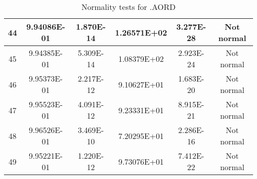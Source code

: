 \begin{table}[h]
\begin{tabular}{|c|c|c|c|c|c|}
		44 & 9.94086E-01 & 1.870E-14 & 1.26571E+02 & 3.277E-28 & Not normal\\\hline
		45 & 9.94385E-01 & 5.309E-14 & 1.08379E+02 & 2.923E-24 & Not normal\\\hline
		46 & 9.95373E-01 & 2.217E-12 & 9.10627E+01 & 1.683E-20 & Not normal\\\hline
		47 & 9.95523E-01 & 4.091E-12 & 9.23331E+01 & 8.915E-21 & Not normal\\\hline
		48 & 9.96526E-01 & 3.469E-10 & 7.20295E+01 & 2.286E-16 & Not normal\\\hline
		49 & 9.95221E-01 & 1.220E-12 & 9.73076E+01 & 7.412E-22 & Not normal\\\hline
	\end{tabular}
	\caption{Normality tests for .AORD}
	\label{tab:normality_tests_AORD}
\end{table}
